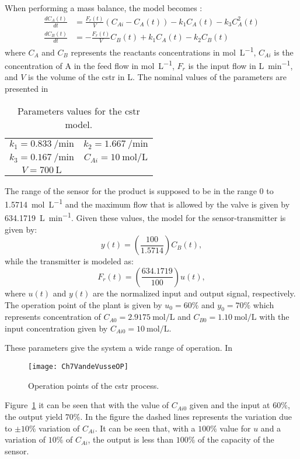 When performing a mass balance, the model becomes \citep{Arrieta2010}:
%
\begin{equation}
\begin{split}
\frac{dC_A(t)}{dt} & = \frac{F_r(t)}{V} \left(C_{Ai}-C_A(t)\right) - k_1 C_A(t) - k_3 C^2_A(t)\\
\frac{dC_B(t)}{dt} & = -\frac{F_r(t)}{V} C_B(t)+ k_1 C_A(t) - k_2 C_B(t)
\end{split}
\label{eq:CSTRMVE}
\end{equation}
%
where $C_A$ and $C_B$ represents the reactants concentrations  in \si{\mole\per\liter}, $C_{Ai}$ is the concentration of A in the feed flow in \si{\mole\per\liter}, $F_r$ is the input flow in \si{\liter\per\minute}, and $V$ is the volume of the \gls{cstr} in \si{\liter}. The nominal values of the parameters are presented in %
%
\begin{table}[tb]
	\centering
	\caption{Parameters values for the \gls{cstr} model.}
	\begin{tabular}{cc}
		\toprule
		$k_1 = \SI{0.833}{\per\minute}$ & $k_2 = \SI{1.667}{\per\minute}$ \\
		$k_3 = \SI{0.167}{\per\minute}$ & $C_{Ai} = \SI{10}{\mole\per\liter}$\\
		$V = \SI{700}{\liter}$\\
		\bottomrule
	\end{tabular}
	\label{tab:ParamCSTR}
\end{table}
%

The range of the sensor for the product is supposed to be in the range 0 to \SI{1.5714}{\mole\per\liter} and the maximum flow that is allowed by the valve is given by \SI{634.1719}{\liter\per\minute}. Given these values, the model for the sensor-transmitter is given by:
\begin{equation}
	y(t) = \left(\frac{100}{1.5714}\right) C_B(t),
	\label{eq:Sensor}
\end{equation}
%
while the transmitter is modeled as:
\begin{equation}
F_r(t) = \left(\frac{634.1719}{100}\right) u(t),
\label{eq:Transmiter}
\end{equation}
%
where $u(t)$ and $y(t)$ are the normalized input and output signal, respectively. The operation point of the plant is given by $u_0 = 60\%$ and $y_0 = 70\%$ which represents concentration of $C_{A0} = \SI{2.9175}{\mole\per\liter}$ and $C_{B0} = \SI{1.10}{\mole\per\liter}$ with the input concentration given by $C_{Ai0} = \SI{10}{\mole\per\liter}$.

These parameters give the system a wide range of operation. In %
\begin{figure}
	\centering
	\texttt{[image: Ch7VandeVusseOP]}
	\caption{Operation points of the \gls{cstr} process.}
	\label{fig:Ch7VandeVusseOP}
\end{figure}
Figure~\ref{fig:Ch7VandeVusseOP} it can be seen that with the value of $C_{Ai0}$ given and the input at $60\%$, the output yield $70\%$. In the figure the dashed lines represents the variation due to $\pm 10\%$ variation of $C_{Ai}$. It can be seen that, with a $100 \%$ value for $u$ and a variation of $10\%$ of $C_{Ai}$, the output is less than $100\%$ of the capacity of the sensor.

